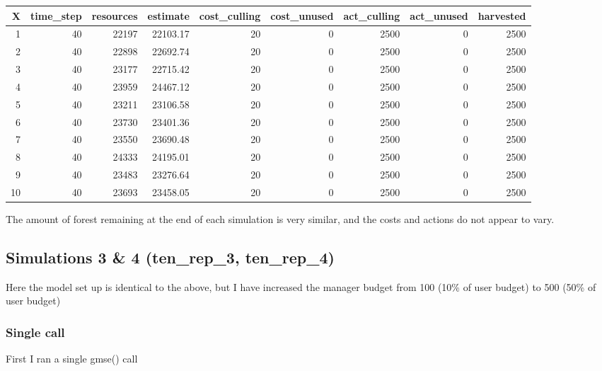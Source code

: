 \documentclass[
]{article}
\begin{document}
\begin{longtable}[]{@{}rrrrrrrrr@{}}
\toprule
X & time\_step & resources & estimate & cost\_culling & cost\_unused &
act\_culling & act\_unused & harvested\tabularnewline
\midrule
\endhead
1 & 40 & 22197 & 22103.17 & 20 & 0 & 2500 & 0 & 2500\tabularnewline
2 & 40 & 22898 & 22692.74 & 20 & 0 & 2500 & 0 & 2500\tabularnewline
3 & 40 & 23177 & 22715.42 & 20 & 0 & 2500 & 0 & 2500\tabularnewline
4 & 40 & 23959 & 24467.12 & 20 & 0 & 2500 & 0 & 2500\tabularnewline
5 & 40 & 23211 & 23106.58 & 20 & 0 & 2500 & 0 & 2500\tabularnewline
6 & 40 & 23730 & 23401.36 & 20 & 0 & 2500 & 0 & 2500\tabularnewline
7 & 40 & 23550 & 23690.48 & 20 & 0 & 2500 & 0 & 2500\tabularnewline
8 & 40 & 24333 & 24195.01 & 20 & 0 & 2500 & 0 & 2500\tabularnewline
9 & 40 & 23483 & 23276.64 & 20 & 0 & 2500 & 0 & 2500\tabularnewline
10 & 40 & 23693 & 23458.05 & 20 & 0 & 2500 & 0 & 2500\tabularnewline
\bottomrule
\end{longtable}

The amount of forest remaining at the end of each simulation is very
similar, and the costs and actions do not appear to vary.

\hypertarget{simulations-3-4-ten_rep_3-ten_rep_4}{%
\subsection{Simulations 3 \& 4 (ten\_rep\_3,
ten\_rep\_4)}\label{simulations-3-4-ten_rep_3-ten_rep_4}}

Here the model set up is identical to the above, but I have increased
the manager budget from 100 (10\% of user budget) to 500 (50\% of user
budget)

\hypertarget{single-call-1}{%
\subsubsection{Single call}\label{single-call-1}}

First I ran a single gmse() call
\end{document}

